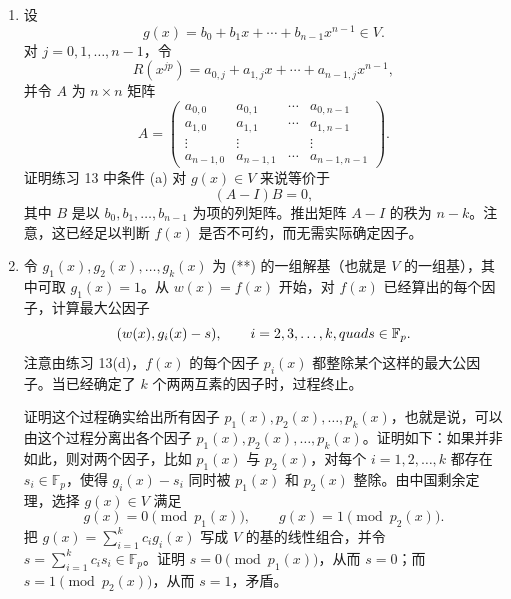 \begin{enumerate}
\item 设
\[
g(x)=b_0+b_1x+\cdots+b_{n-1}x^{n-1}\in V.
\]
对 $j=0,1,\ldots,n-1$，令
\[
R(x^{jp})=a_{0,j}+a_{1,j}x+\cdots+a_{n-1,j}x^{n-1},
\]
并令 $A$ 为 $n\times n$ 矩阵
\[
A=\begin{pmatrix}
a_{0,0}&a_{0,1}&\cdots&a_{0,n-1}\\
a_{1,0}&a_{1,1}&\cdots&a_{1,n-1}\\
\vdots&\vdots& &\vdots\\
a_{n-1,0}&a_{n-1,1}&\cdots&a_{n-1,n-1}
\end{pmatrix}.
\]
证明练习 13 中条件 (a) 对 $g(x)\in V$ 来说等价于
\[
(A-I)B=0,
\tag{**}
\]
其中 $B$ 是以 $b_0,b_1,\ldots,b_{n-1}$ 为项的列矩阵。推出矩阵 $A-I$ 的秩为 $n-k$。注意，这已经足以判断 $f(x)$ 是否不可约，而无需实际确定因子。

\item 令 $g_1(x),g_2(x),\ldots,g_k(x)$ 为 (**) 的一组解基（也就是 $V$ 的一组基），其中可取 $g_1(x)=1$。从 $w(x)=f(x)$ 开始，对 $f(x)$ 已经算出的每个因子，计算最大公因子
\[
(w(x),g_i(x)-s),\qquad i=2,3,\ldots,k,\\quad s\in\mathbb F_p.
\]
注意由练习 13(d)，$f(x)$ 的每个因子 $p_i(x)$ 都整除某个这样的最大公因子。当已经确定了 $k$ 个两两互素的因子时，过程终止。

证明这个过程确实给出所有因子 $p_1(x),p_2(x),\ldots,p_k(x)$，也就是说，可以由这个过程分离出各个因子 $p_1(x),p_2(x),\ldots,p_k(x)$。证明如下：如果并非如此，则对两个因子，比如 $p_1(x)$ 与 $p_2(x)$，对每个 $i=1,2,\ldots,k$ 都存在 $s_i\in\mathbb F_p$，使得 $g_i(x)-s_i$ 同时被 $p_1(x)$ 和 $p_2(x)$ 整除。由中国剩余定理，选择 $g(x)\in V$ 满足
\[
g(x)=0\pmod{p_1(x)},\qquad g(x)=1\pmod{p_2(x)}.
\]
把 $g(x)=\sum_{i=1}^k c_i g_i(x)$ 写成 $V$ 的基的线性组合，并令 $s=\sum_{i=1}^k c_i s_i\in\mathbb F_p$。证明 $s=0\pmod{p_1(x)}$，从而 $s=0$；而 $s=1\pmod{p_2(x)}$，从而 $s=1$，矛盾。


\end{enumerate}
